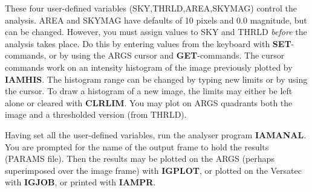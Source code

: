 These four user-defined variables (SKY,THRLD,AREA,SKYMAG) control the analysis.
AREA and SKYMAG have defaults of 10 pixels and 0.0 magnitude, but can be
changed.
However, you must assign values to SKY and THRLD {\em before} the analysis takes
place.
Do this by entering values from the keyboard with {\bf SET}-commands, or by
using the ARGS cursor and {\bf GET}-commands.
The cursor commands work on an intensity histogram of the image previously
plotted by {\bf IAMHIS}.
The histogram range can be changed by typing new limits or by using the cursor.
To draw a histogram of a new image, the limits may either be left alone or
cleared with {\bf CLRLIM}.
You may plot on ARGS quadrants both the image and a thresholded version (from
THRLD).

Having set all the user-defined variables, run the analyser program
{\bf IAMANAL}.
You are prompted for the name of the output frame to hold the results (PARAMS
file).
Then the results may be plotted on the ARGS (perhaps superimposed over the
image frame) with {\bf IGPLOT}, or plotted on the Versatec with {\bf IGJOB}, or
printed with {\bf IAMPR}.
